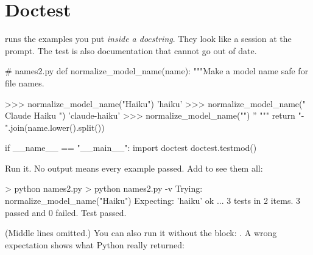 \begin{center}
\end{center}

\section{Doctest}

 runs the examples you put \emph{inside a docstring}. They look like a session at the
\code{>{}>{}>} prompt. The test is also documentation that cannot go out of date.

\begin{pycode}
# names2.py
def normalize_model_name(name):
    """Make a model name safe for file names.

    >>> normalize_model_name("Haiku")
    'haiku'
    >>> normalize_model_name("  Claude   Haiku ")
    'claude-haiku'
    >>> normalize_model_name("")
    ''
    """
    return "-".join(name.lower().split())


if __name__ == "__main__":
    import doctest
    doctest.testmod()
\end{pycode}

Run it. No output means every example passed. Add  to see them all:

\begin{rawcode}
> python names2.py
> python names2.py -v
Trying:
    normalize_model_name("Haiku")
Expecting:
    'haiku'
ok
...
3 tests in 2 items.
3 passed and 0 failed.
Test passed.
\end{rawcode}

(Middle lines omitted.) You can also run it without the  block: .
A wrong expectation shows what Python really returned:

